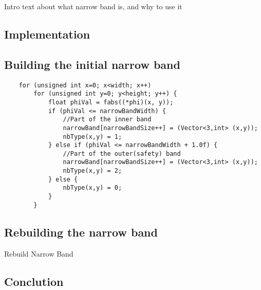 Intro text about what narrow band is, and why to use it



\subsection{Implementation}


\subsection{Building the initial narrow band}
\begin{lstlisting}
    for (unsigned int x=0; x<width; x++)
        for (unsigned int y=0; y<height; y++) {
            float phiVal = fabs((*phi)(x, y));
            if (phiVal <= narrowBandWidth) {
                //Part of the inner band
                narrowBand[narrowBandSize++] = (Vector<3,int> (x,y));
                nbType(x,y) = 1;
            } else if (phiVal <= narrowBandWidth + 1.0f) {
                //Part of the outer(safety) band
                narrowBand[narrowBandSize++] = (Vector<3,int> (x,y));
                nbType(x,y) = 2;
            } else {
                nbType(x,y) = 0;
            }
        }
\end{lstlisting}



\subsection{Rebuilding the narrow band}
Rebuild Narrow Band





\subsection{Conclution}
